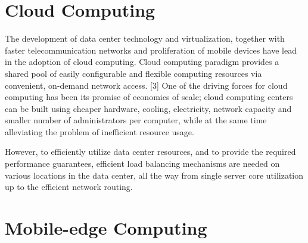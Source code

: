 \section{Cloud Computing}
The development of data center technology and virtualization, together with faster telecommunication networks and proliferation of mobile devices have lead in the adoption of cloud computing. Cloud computing paradigm provides a shared pool of easily configurable and flexible computing resources via convenient, on-demand network access. [3] One of the driving forces for cloud computing has been its promise of economics of scale; cloud computing centers can be built using cheaper hardware, cooling, electricity, network capacity and smaller number of administrators per computer, while at the same time alleviating the problem of inefficient resource usage.

However, to efficiently utilize data center resources, and to provide the required performance guarantees, efficient load balancing mechanisms are needed on various locations in the data center, all the way from single server core utilization up to the efficient network routing.



\section{Mobile-edge Computing}


